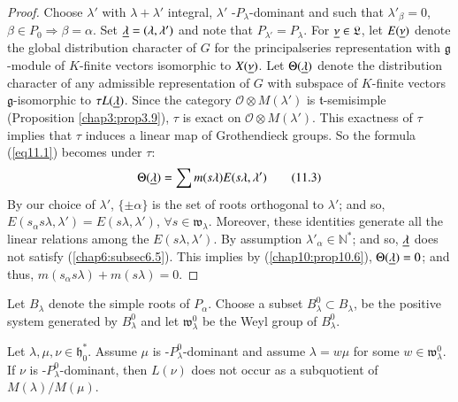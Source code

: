 \begin{proof}
Choose $\lambda'$ with $\lambda + \lambda'$ integral, $\lambda'$
-$P_\lambda$-dominant and such that $\lambda'_\beta = 0$, $\beta \in
P_0 \Rightarrow \beta = \alpha$. Set $\underline{\lambda} = (\lambda,
\lambda')$ and note that $P_{\lambda'} = P_{\lambda}$. For $\underline{\nu}
\in \mathfrak{L}$, let $E(\underline{\nu})$ denote the global distribution
character of $G$ for the principal\pageoriginale series representation
with $\mathfrak{g}$-module of $K$-finite vectors isomorphic to
$X(\underline{\nu})$. Let $\Theta (\underline{\lambda})$ denote the distribution
character of any admissible representation of $G$ with
subspace of $K$-finite vectors $\mathfrak{g}$-isomorphic to $\tau
L(\underline{\lambda})$. Since the category $\mathscr{O} \otimes M(\lambda')$
is $\mathfrak{t}$-semisimple (Proposition \ref{chap3:prop3.9}), $\tau$ is exact on
$\mathscr{O} \otimes M(\lambda')$. This exactness of $\tau$ implies
that $\tau$ induces a linear map of Grothendieck groups. So the
formula (\ref{eq11.1}) becomes under $\tau$:
\begin{equation*}
\Theta (\underline{\lambda}) = \sum m (s\lambda) E (s\lambda, \lambda')
\tag{11.3}\label{eq11.3} 
\end{equation*}
By our choice of $\lambda'$, $\{\pm \alpha\}$ is the set of roots
orthogonal to $\lambda'$; and so, $E(s_\alpha s \lambda, \lambda') =
E(s\lambda, \lambda')$, $\forall s \in
\mathfrak{w}_\lambda$. Moreover, these identities generate all the
linear relations among the $E(s\lambda, \lambda')$. By assumption
$\lambda'_\alpha \in \mathbb{N}^*$; and so, $\underline{\lambda}$ does not satisfy
(\ref{chap6:subsec6.5}). This implies by (\ref{chap10:prop10.6}),
$\Theta (\underline{\lambda}) = 0$; and thus, 
$m(s_\alpha s \lambda) + m (s\lambda) = 0$. 
\end{proof}

Let $B_\lambda$ denote the simple roots of $P_\alpha$. Choose a subset
$B^0_\lambda \subset B_\lambda$, be the positive system generated by
$B^0_\lambda$ and let $\mathfrak{w}^0_\lambda$ be the Weyl group of
$B^0_\lambda$. 


\setcounter{prop}{3}
\begin{prop}\label{chap11:prop11.4}
Let $\lambda, \mu, \nu \in \mathfrak{h}^*_0$. Assume $\mu$ is
-$P^0_\lambda$-dominant and assume $\lambda = w\mu$ for some $w \in
\mathfrak{w}^0_\lambda$. If $\nu$ is -$P^0_\lambda$-dominant, then
$L(\nu)$ does not occur as a subquotient of $M(\lambda) / M (\mu)$. 
\end{prop}

